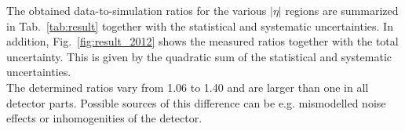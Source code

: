 The obtained data-to-simulation ratios for the various $|\eta|$ regions are summarized in Tab.~\ref{tab:result} together with the statistical and systematic uncertainties. In addition, Fig.~\ref{fig:result_2012} shows the measured ratios together with the total uncertainty. This is given by the quadratic sum of the statistical and systematic uncertainties. \\
The determined ratios vary from 1.06 to 1.40 and are larger than one in all detector parts. Possible sources of this difference can be e.g. mismodelled noise effects or inhomogenities of the detector.

\begin{table}[!h]
\centering
\caption{Measured data-to-simulation ratio in various $|\eta|$ regions with statistical and systematic uncertainty as well as the total uncertainty.}
\label{tab:result}
\end{table} 

